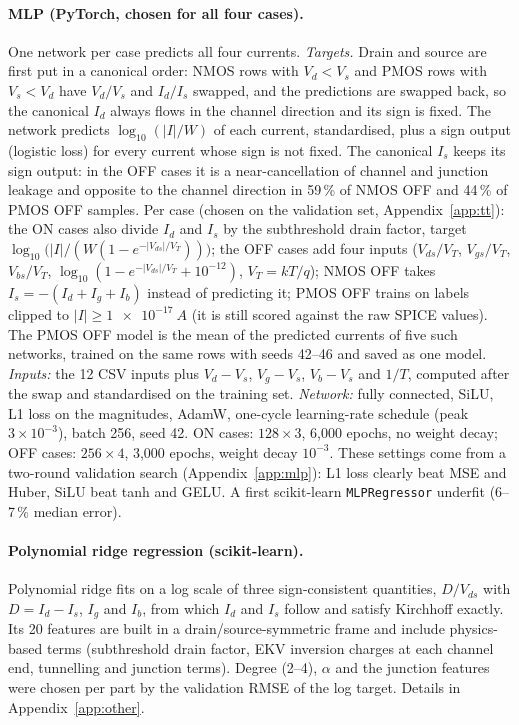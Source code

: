 \documentclass[11pt,a4paper]{article}
\begin{document}
\paragraph{MLP (PyTorch, chosen for all four cases).} One network per case predicts all four currents.
\emph{Targets.} Drain and source are first put in a canonical order: NMOS rows with $V_d < V_s$
and PMOS rows with $V_s < V_d$ have $V_d/V_s$ and $I_d/I_s$ swapped, and the predictions are swapped
back, so the canonical $I_d$ always flows in the channel direction and its sign is fixed. The network
predicts $\log_{10}(|I|/W)$ of each current, standardised, plus a sign output (logistic loss) for every
current whose sign is not fixed. The canonical $I_s$ keeps its sign output: in the OFF cases it is a
near-cancellation of channel and junction leakage and opposite to the channel direction in 59\,\% of
NMOS OFF and 44\,\% of PMOS OFF samples. Per case (chosen on the validation set, Appendix~\ref{app:tt}):
the ON cases also divide $I_d$ and $I_s$ by the subthreshold drain factor, target
$\log_{10}\bigl(|I| / (W(1-e^{-|V_{ds}|/V_T}))\bigr)$; the OFF cases add four inputs
($V_{ds}/V_T$, $V_{gs}/V_T$, $V_{bs}/V_T$, $\log_{10}(1-e^{-|V_{ds}|/V_T}+10^{-12})$, $V_T = kT/q$);
NMOS OFF takes $I_s = -(I_d + I_g + I_b)$ instead of predicting it; PMOS OFF trains on labels
clipped to $|I| \ge \SI{1e-17}{A}$ (it is still scored against the raw SPICE values). The PMOS OFF model is
the mean of the predicted currents of five such networks, trained on the same rows with seeds 42--46 and
saved as one model.
\emph{Inputs:} the 12 CSV inputs plus $V_d-V_s$, $V_g-V_s$, $V_b-V_s$ and $1/T$, computed after
the swap and standardised on the training set.
\emph{Network:} fully connected, SiLU, L1 loss on the magnitudes, AdamW, one-cycle
learning-rate schedule (peak $3\times10^{-3}$), batch 256, seed 42.
ON cases: $128\times3$, 6,000 epochs, no weight decay; OFF cases: $256\times4$,
3,000 epochs, weight decay $10^{-3}$. These settings come from a two-round validation search
(Appendix~\ref{app:mlp}): L1 loss clearly beat MSE and Huber, SiLU beat tanh and GELU.
A first scikit-learn \texttt{MLPRegressor} underfit (6--7\,\% median error).

\paragraph{Polynomial ridge regression (scikit-learn).} Polynomial ridge fits on a log scale of three
sign-consistent quantities, $D/V_{ds}$ with $D = I_d - I_s$, $I_g$ and $I_b$, from which $I_d$ and $I_s$
follow and satisfy Kirchhoff exactly. Its 20 features are built in a drain/source-symmetric frame and
include physics-based terms (subthreshold drain factor, EKV inversion charges at each channel end,
tunnelling and junction terms). Degree (2--4), $\alpha$ and the junction features were chosen per part by
the validation RMSE of the log target. Details in Appendix~\ref{app:other}.
\end{document}
